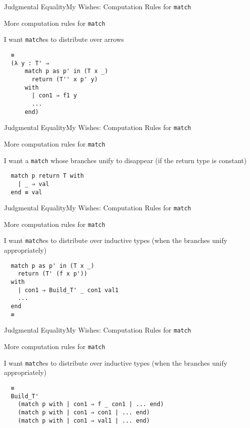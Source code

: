 \documentclass{beamer}
\begin{document}
\begin{frame}[fragile]{Judgmental Equality}{My Wishes: Computation Rules for \texorpdfstring{\texttt{match}}{match}}
  \Large
  \begin{center}
    More computation rules for \texttt{match}
  \end{center}
  I want \texttt{match}es to distribute over arrows
\begin{verbatim}
  ≡
  (λ y : T' ⇒ 
      match p as p' in (T x _)
        return (T'' x p' y)
      with
        | con1 ⇒ f1 y
        ...
      end)
\end{verbatim}
\end{frame}

\begin{frame}[fragile]{Judgmental Equality}{My Wishes: Computation Rules for \texorpdfstring{\texttt{match}}{match}}
  \Large
  \begin{center}
    More computation rules for \texttt{match}
  \end{center}
  I want a \texttt{match} whose branches unify to disappear (if the return type is constant)
\begin{verbatim}
  match p return T with
    | _ ⇒ val
  end ≡ val
\end{verbatim}
\end{frame}

\begin{frame}[fragile]{Judgmental Equality}{My Wishes: Computation Rules for \texorpdfstring{\texttt{match}}{match}}
  \Large
  \begin{center}
    More computation rules for \texttt{match}
  \end{center}
  I want \texttt{match}es to distribute over inductive types (when the branches unify appropriately)
\begin{verbatim}
  match p as p' in (T x _)
    return (T' (f x p'))
  with
    | con1 ⇒ Build_T' _ con1 val1
    ...
  end
  ≡
\end{verbatim}
\end{frame}

\begin{frame}[fragile]{Judgmental Equality}{My Wishes: Computation Rules for \texorpdfstring{\texttt{match}}{match}}
  \Large
  \begin{center}
    More computation rules for \texttt{match}
  \end{center}
  I want \texttt{match}es to distribute over inductive types (when the branches unify appropriately)
\begin{verbatim}
  ≡
  Build_T'
    (match p with | con1 ⇒ f _ con1 | ... end)
    (match p with | con1 ⇒ con1 | ... end)
    (match p with | con1 ⇒ val1 | ... end)
    
    
\end{verbatim}
\end{frame}
\end{document}
